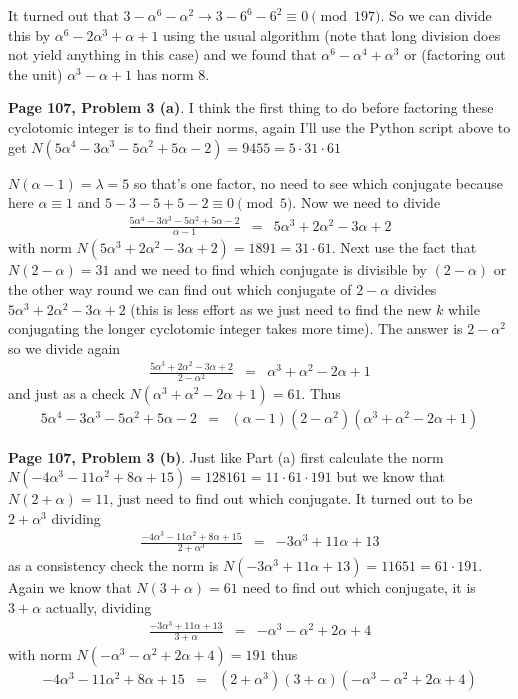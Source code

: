 \documentclass[aps,preprint,preprintnumbers,nofootinbib,showpacs,prd]{revtex4-1}
\newcommand{\nbea}{\begin{eqnarray*}}
\newcommand{\neea}{\end{eqnarray*}}
\begin{document}
It turned out that $3 - \alpha^6 - \alpha^2 \to 3 - 6^6 - 6^2 \equiv 0 \pmod{197}$. So we can divide this by $\alpha^6 - 2\alpha^3 + \alpha + 1$ using the usual algorithm (note that long division does not yield anything in this case) and we found that $\alpha^6 - \alpha^4 + \alpha^3$ or (factoring out the unit) $\alpha^3 - \alpha + 1$ has norm 8.

{\bf Page 107, Problem 3 (a)}. I think the first thing to do before factoring these cyclotomic integer is to find their norms, again I'll use the Python script above to get $N(5\alpha^4 - 3\alpha^3 - 5\alpha^2 + 5\alpha - 2) = 9455 = 5 \cdot 31 \cdot 61$

$N(\alpha - 1) = \lambda = 5$ so that's one factor, no need to see which conjugate because here $\alpha \equiv 1$ and $5 - 3 - 5 + 5 - 2 \equiv 0 \pmod{5}$. Now we need to divide 
%
\nbea
\frac{5\alpha^4 - 3\alpha^3 - 5\alpha^2 + 5\alpha - 2}{\alpha - 1} & = & 5\alpha^3 + 2\alpha^2 - 3\alpha + 2
\neea
%
with norm $N(5\alpha^3 + 2\alpha^2 - 3\alpha + 2) = 1891 = 31 \cdot 61$. Next use the fact that $N(2 - \alpha) = 31$ and we need to find which conjugate is divisible by $(2 - \alpha)$ or the other way round we can find out which conjugate of $2 - \alpha$ divides $5\alpha^3 + 2\alpha^2 - 3\alpha + 2$ (this is less effort as we just need to find the new $k$ while conjugating the longer cyclotomic integer takes more time). The answer is $2 - \alpha^2$ so we divide again
%
\nbea
\frac{5\alpha^3 + 2\alpha^2 - 3\alpha + 2}{2 - \alpha^2} & = & \alpha^3 + \alpha^2 - 2\alpha + 1
\neea
%
and just as a check $N(\alpha^3 + \alpha^2 - 2\alpha + 1) = 61$. Thus
%
\nbea
5\alpha^4 - 3\alpha^3 - 5\alpha^2 + 5\alpha - 2 & = & (\alpha - 1)(2 - \alpha^2)(\alpha^3 + \alpha^2 - 2\alpha + 1)
\neea
%

{\bf Page 107, Problem 3 (b)}. Just like Part (a) first calculate the norm $N(-4\alpha^3 - 11\alpha^2 + 8\alpha + 15) = 128161 = 11 \cdot 61 \cdot 191$ but we know that $N(2 + \alpha) = 11$, just need to find out which conjugate. It turned out to be $2 + \alpha^3$ dividing
%
\nbea
\frac{-4\alpha^3 - 11\alpha^2 + 8\alpha + 15}{2 + \alpha^3} & = & -3\alpha^3 + 11\alpha + 13
\neea
%
as a consistency check the norm is $N(-3\alpha^3 + 11\alpha + 13) = 11651 = 61 \cdot 191$. Again we know that $N(3 + \alpha) = 61$ need to find out which conjugate, it is $3 + \alpha$ actually, dividing
%
\nbea
\frac{-3\alpha^3 + 11\alpha + 13}{3 + \alpha} & = & -\alpha^3 - \alpha^2 + 2\alpha + 4
\neea
%
with norm $N(-\alpha^3 - \alpha^2 + 2\alpha + 4) = 191$ thus
%
\nbea
-4\alpha^3 - 11\alpha^2 + 8\alpha + 15 & = & (2 + \alpha^3)(3 + \alpha)(-\alpha^3 - \alpha^2 + 2\alpha + 4)
\neea
%
\end{document}
